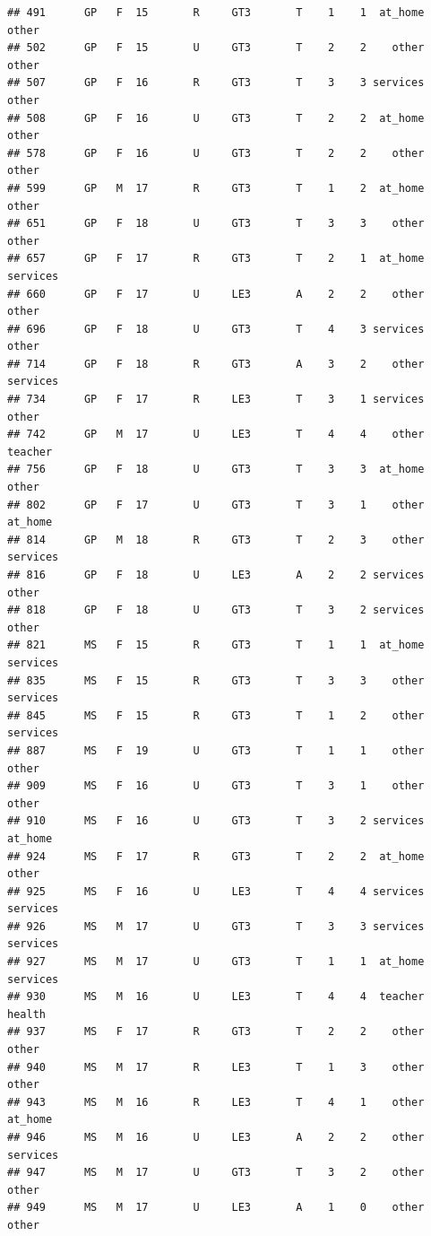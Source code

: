 \documentclass[]{article}
\begin{document}
\begin{verbatim}
## 491      GP   F  15       R     GT3       T    1    1  at_home    other
## 502      GP   F  15       U     GT3       T    2    2    other    other
## 507      GP   F  16       R     GT3       T    3    3 services    other
## 508      GP   F  16       U     GT3       T    2    2  at_home    other
## 578      GP   F  16       U     GT3       T    2    2    other    other
## 599      GP   M  17       R     GT3       T    1    2  at_home    other
## 651      GP   F  18       U     GT3       T    3    3    other    other
## 657      GP   F  17       R     GT3       T    2    1  at_home services
## 660      GP   F  17       U     LE3       A    2    2    other    other
## 696      GP   F  18       U     GT3       T    4    3 services    other
## 714      GP   F  18       R     GT3       A    3    2    other services
## 734      GP   F  17       R     LE3       T    3    1 services    other
## 742      GP   M  17       U     LE3       T    4    4    other  teacher
## 756      GP   F  18       U     GT3       T    3    3  at_home    other
## 802      GP   F  17       U     GT3       T    3    1    other  at_home
## 814      GP   M  18       R     GT3       T    2    3    other services
## 816      GP   F  18       U     LE3       A    2    2 services    other
## 818      GP   F  18       U     GT3       T    3    2 services    other
## 821      MS   F  15       R     GT3       T    1    1  at_home services
## 835      MS   F  15       R     GT3       T    3    3    other services
## 845      MS   F  15       R     GT3       T    1    2    other services
## 887      MS   F  19       U     GT3       T    1    1    other    other
## 909      MS   F  16       U     GT3       T    3    1    other    other
## 910      MS   F  16       U     GT3       T    3    2 services  at_home
## 924      MS   F  17       R     GT3       T    2    2  at_home    other
## 925      MS   F  16       U     LE3       T    4    4 services services
## 926      MS   M  17       U     GT3       T    3    3 services services
## 927      MS   M  17       U     GT3       T    1    1  at_home services
## 930      MS   M  16       U     LE3       T    4    4  teacher   health
## 937      MS   F  17       R     GT3       T    2    2    other    other
## 940      MS   M  17       R     LE3       T    1    3    other    other
## 943      MS   M  16       R     LE3       T    4    1    other  at_home
## 946      MS   M  16       U     LE3       A    2    2    other services
## 947      MS   M  17       U     GT3       T    3    2    other    other
## 949      MS   M  17       U     LE3       A    1    0    other    other

\end{verbatim}
\end{document}
